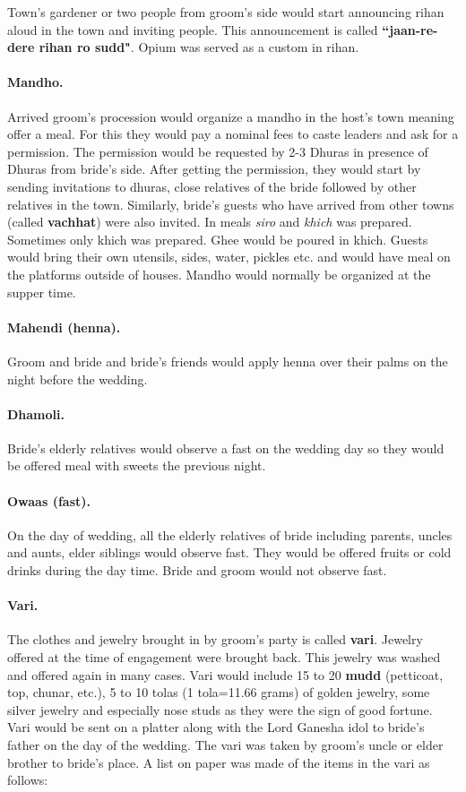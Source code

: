 Town's gardener or two people from groom's side would start announcing rihan
aloud in the town and inviting people. This announcement is called
\textbf{``jaan-re-dere rihan ro sudd"}. Opium was served as a custom in rihan.

\paragraph{Mandho.} Arrived groom's procession would organize a mandho in the
host's town meaning offer a meal. For this they would pay a nominal fees to
caste leaders and ask for a permission. The permission would be requested by
2-3 Dhuras in presence of Dhuras from bride's side. After getting the
permission, they would start by sending invitations to dhuras, close relatives
of the bride followed by other relatives in the town. Similarly, bride's guests
who have arrived from other towns (called \textbf{vachhat}) were also invited.
In meals \textit{siro} and \textit{khich} was prepared. Sometimes only khich
was prepared. Ghee would be poured in khich. Guests would bring their own
utensils, sides, water, pickles etc. and would have meal on the platforms
outside of houses. Mandho would normally be organized at the supper time.

\paragraph{Mahendi (henna).} Groom and bride and bride's friends would apply
henna over their palms on the night before the wedding.

\paragraph{Dhamoli.} Bride's elderly relatives would observe a fast on the
wedding day so they would be offered meal with sweets the previous night.

\paragraph{Owaas (fast).} On the day of wedding, all the elderly relatives of
bride including parents, uncles and aunts, elder siblings would observe fast.
They would be offered fruits or cold drinks during the day time. Bride and
groom would not observe fast.

\paragraph{Vari.} The clothes and jewelry brought in by groom's party is called
\textbf{vari}. Jewelry offered at the time of engagement were brought back.
This jewelry was washed and offered again in many cases. Vari would include 15
to 20 \textbf{mudd} (petticoat, top, chunar, etc.), 5 to 10 tolas (1 tola=11.66
grams) of golden jewelry, some silver jewelry and especially nose studs as they
were the sign of good fortune. Vari would be sent on a platter along with the
Lord Ganesha idol to bride's father on the day of the wedding. The vari was
taken by groom's uncle or elder brother to bride's place. A list on paper was
made of the items in the vari as follows:

